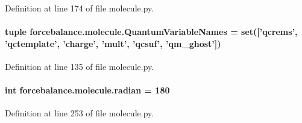 Definition at line 174 of file molecule.\-py.

\hypertarget{namespaceforcebalance_1_1molecule_ab67efeab6049ec1f416b9ad1eed6ffcc}{
\paragraph[{Quantum\-Variable\-Names}]{\setlength{\rightskip}{0pt plus 5cm}tuple forcebalance.\-molecule.\-Quantum\-Variable\-Names = set(\mbox{[}'qcrems', 'qctemplate', 'charge', 'mult', 'qcsuf', 'qm\-\_\-ghost'\mbox{]})}}\label{namespaceforcebalance_1_1molecule_ab67efeab6049ec1f416b9ad1eed6ffcc}


Definition at line 135 of file molecule.\-py.

\hypertarget{namespaceforcebalance_1_1molecule_a1ee5389ce8a9042e053c7972dbbfb005}{
\paragraph[{radian}]{\setlength{\rightskip}{0pt plus 5cm}int forcebalance.\-molecule.\-radian = 180}}\label{namespaceforcebalance_1_1molecule_a1ee5389ce8a9042e053c7972dbbfb005}


Definition at line 253 of file molecule.\-py.

